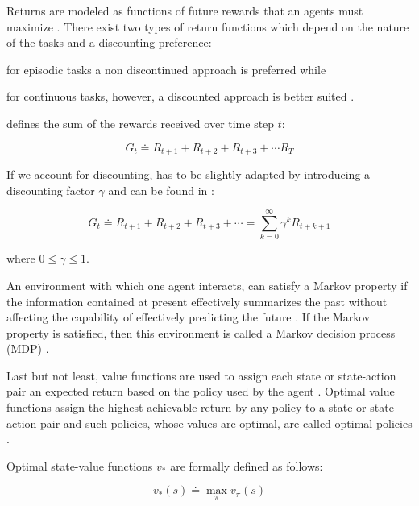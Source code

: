 \documentclass{seal_thesis}
\begin{document}
Returns are modeled as functions of future rewards that an agents must maximize \cite[p. 73]{Sutton1998}. There exist two types of return functions which depend on the nature of the tasks and a discounting preference:
\begin{enumerate*}
	\item for episodic tasks a non discontinued approach is preferred while
	\item for continuous tasks, however, a discounted approach is better suited \cite[p. 73]{Sutton1998}.
\end{enumerate*}

 defines the sum of the rewards received over time step $t$:

\begin{equation}
\label{eq:expected_return}
	G_t  \doteq R_{t+1} + R_{t+2} + R_{t+3} + \cdots R_{T}
\end{equation}

If we account for discounting,  has to be slightly adapted by introducing a discounting factor $\gamma$ and can be found in :

\begin{equation}
\label{eq:expected_discounted_return}
	G_t  \doteq R_{t+1} + R_{t+2} + R_{t+3} + \cdots = \sum_{k=0}^\infty \gamma^k R_{t+k+1}
\end{equation}

where $0 \leq \gamma \leq 1$.

An environment  with which one agent interacts, can satisfy a Markov property if the information contained at present effectively summarizes the past without affecting the capability of effectively predicting the future \cite[p. 73]{Sutton1998}. If the Markov property is satisfied, then this environment is called a Markov decision process (MDP) \cite[p. 73]{Sutton1998}.

Last but not least, value functions are used to assign each state or state-action pair an expected return based on the policy used by the agent \cite[p. 74]{Sutton1998}. Optimal value functions assign the highest achievable return by any policy to a state or state-action pair  and such policies, whose values are optimal, are called optimal policies \cite[p. 74]{Sutton1998}.

Optimal state-value functions $v_*$ are formally defined as follows:

\begin{equation}
	v_* (s) \doteq \max_\pi v_\pi (s)
\end{equation}
\end{document}

